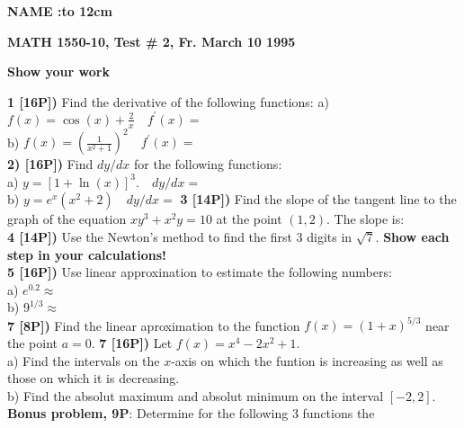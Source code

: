 \documentclass[12pt]{article}
\begin{document}
\centerline{\large\bf NAME :\hbox to 12cm{\hrulefill}}

\centerline{\bf MATH 1550-10, Test \# 2, Fr. March 10 1995}
\centerline{\bf Show your work}
{\bf 1 [16P])}  Find the derivative of the following functions:
a) $\displaystyle{f(x) = \cos (x)+\frac{2}{x} \quad f^\prime(x) =}$
\\ %
b) $\displaystyle{f(x) = \left(\frac{1}{x^2+1}\right)^2\quad f^\prime(x) =}$
\\ %
{\bf 2) [16P])} Find $dy/dx$ for the following functions:
\\ %
a) $ \displaystyle{y = [1  + \ln (x)]^3. \quad dy/dx =}$
\\ %
b) $\displaystyle{y = e^x(x^2+2)\quad dy/dx =}$
{\bf 3 [14P])} 
Find the slope of the tangent line to the graph
of the equation 
$\displaystyle{xy^3+x^2y=10}$
at the point $(1,2)$.
The slope is: 
\\ %
{\bf 4 [14P])} Use the Newton's method to
find the first 3 digits in $\displaystyle{\sqrt{7}}$.
{\bf Show each step in your calculations!}
\\
\hfill
{}
{\bf 5 [16P])} Use linear approxination to estimate the 
following
numbers: 
\\ %
a) $\displaystyle{e^{0.2} \approx }$
\\ %
b) $9^{1/3}\displaystyle{\approx}$
\\ %
{\bf 7 [8P])}  Find the linear aproximation to the
function $\displaystyle{f(x) = (1+x)^{5/3}}$ near the point $a=0$.
{\bf 7 [16P])}  Let $\displaystyle{f(x) = x^4-2x^2+1}$.\\
a) Find the intervals on the $x$-axis on which the funtion is 
increasing as
well as those on which it is decreasing.
\\ %
b) Find the absolut maximum and absolut minimum on the interval
$[-2,2]$.
\\ %
{\bf Bonus problem, 9P}: Determine for the following 3 functions the
\end{document}

